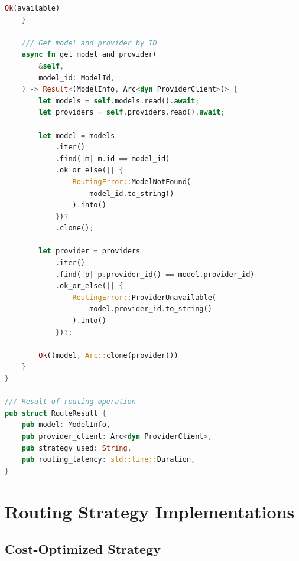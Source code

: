 \documentclass[12pt,a4paper,twoside]{report}
\begin{document}
\begin{lstlisting}[language=Rust,caption={Router Engine - crates/gaussmeridian-router/src/lib.rs}]
        Ok(available)
    }
    
    /// Get model and provider by ID
    async fn get_model_and_provider(
        &self,
        model_id: ModelId,
    ) -> Result<(ModelInfo, Arc<dyn ProviderClient>)> {
        let models = self.models.read().await;
        let providers = self.providers.read().await;
        
        let model = models
            .iter()
            .find(|m| m.id == model_id)
            .ok_or_else(|| {
                RoutingError::ModelNotFound(
                    model_id.to_string()
                ).into()
            })?
            .clone();
        
        let provider = providers
            .iter()
            .find(|p| p.provider_id() == model.provider_id)
            .ok_or_else(|| {
                RoutingError::ProviderUnavailable(
                    model.provider_id.to_string()
                ).into()
            })?;
        
        Ok((model, Arc::clone(provider)))
    }
}

/// Result of routing operation
pub struct RouteResult {
    pub model: ModelInfo,
    pub provider_client: Arc<dyn ProviderClient>,
    pub strategy_used: String,
    pub routing_latency: std::time::Duration,
}
\end{lstlisting}

\section{Routing Strategy Implementations}

\subsection{Cost-Optimized Strategy}
\end{document}
